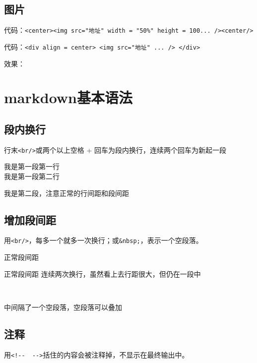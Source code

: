 \documentclass[]{article}
\begin{document}
\hypertarget{section-3}{%
\subsection{图片}\label{section-3}}

代码：\texttt{\textless{}center\textgreater{}\textless{}img\ src="地址"\ width\ =\ "50\%"\ height\ =\ \textquotesingle{}100\textquotesingle{}...\ /\textgreater{}\textless{}center/\textgreater{}}

代码：\texttt{\textless{}div\ align\ =\ center\textgreater{}\ \textless{}img\ src="地址"\ ...\ /\textgreater{}\ \textless{}/div\textgreater{}}

效果：

\hypertarget{markdown}{%
\section{markdown基本语法}\label{markdown}}

\hypertarget{section-4}{%
\subsection{段内换行}\label{section-4}}

行末\texttt{\textless{}br/\textgreater{}}或两个以上空格 + 回车为段内换行，连续两个回车为新起一段

我是第一段第一行\\
我是第一段第二行

我是第二段，注意正常的行间距和段间距

\hypertarget{section-5}{%
\subsection{增加段间距}\label{section-5}}

用\texttt{\textless{}br/\textgreater{}}，每多一个就多一次换行；或\texttt{\&nbsp;}，表示一个空段落。

正常段间距

正常段间距
连续两次换行，虽然看上去行距很大，但仍在一段中

~

中间隔了一个空段落，空段落可以叠加

\hypertarget{section-6}{%
\subsection{注释}\label{section-6}}

用\texttt{\textless{}!-\/-\ \ -\/-\textgreater{}}括住的内容会被注释掉，不显示在最终输出中。
\end{document}
